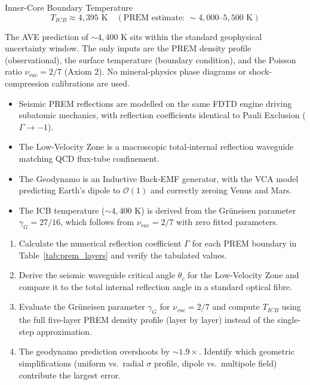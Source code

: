 \begin{resultbox}{Inner-Core Boundary Temperature}
\begin{equation}
    \boxed{T_{ICB} \approx 4{,}395 \text{ K}}
    \quad (\text{PREM estimate: } \sim 4{,}000\text{--}5{,}500 \text{ K})
\end{equation}
\end{resultbox}

\noindent The AVE prediction of $\sim 4{,}400$ K sits within the standard geophysical uncertainty window. The only inputs are the PREM density profile (observational), the surface temperature (boundary condition), and the Poisson ratio $\nu_{vac} = 2/7$ (Axiom 2). No mineral-physics phase diagrams or shock-compression calibrations are used.

\begin{summarybox}
\begin{itemize}
    \item Seismic PREM reflections are modelled on the same FDTD engine driving subatomic mechanics, with reflection coefficients identical to Pauli Exclusion ($\Gamma \to -1$\gammaundeclared{}).
    \item The Low-Velocity Zone is a macroscopic total-internal reflection waveguide matching QCD flux-tube confinement.
    \item The Geodynamo is an Inductive Back-EMF generator, with the VCA model predicting Earth's dipole to $\mathcal{O}(1)$ and correctly zeroing Venus and Mars.
    \item The ICB temperature ($\sim 4{,}400$ K) is derived from the Gr\"uneisen parameter $\gamma_G = 27/16$, which follows from $\nu_{vac} = 2/7$ with zero fitted parameters.
\end{itemize}
\end{summarybox}

\begin{exercisebox}
\begin{enumerate}
    \item Calculate the numerical reflection coefficient $\Gamma$ for each PREM boundary in Table~\ref{tab:prem_layers} and verify the tabulated values.
    \item Derive the seismic waveguide critical angle $\theta_c$ for the Low-Velocity Zone and compare it to the total internal reflection angle in a standard optical fibre.
    \item Evaluate the Gr\"uneisen parameter $\gamma_G$ for $\nu_{vac} = 2/7$ and compute $T_{ICB}$ using the full five-layer PREM density profile (layer by layer) instead of the single-step approximation.
    \item The geodynamo prediction overshoots by $\sim 1.9\times$. Identify which geometric simplifications (uniform vs.\ radial $\sigma$ profile, dipole vs.\ multipole field) contribute the largest error.
\end{enumerate}
\end{exercisebox}

